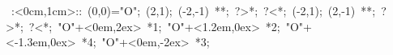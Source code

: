 
%

\hbox{
\xy    <1cm,0cm>:<0cm,1cm>::
       (0,0)="O"; (2,1); (-2,-1) **\dir{-}; ?>*\dir{>}; ?<*\dir{<};
       (-2,1); (2,-1) **\dir{-}; ?>*\dir{>}; ?<*\dir{<};
       "O"+<0em,2ex> *{1};  "O"+<1.2em,0ex> *{2};  "O"+<-1.3em,0ex> *{4};
       "O"+<0em,-2ex> *{3};
       \endxy}


